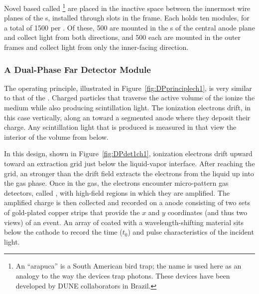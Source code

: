 Novel  based  called \footnote{An ``arapuca'' is a South American bird trap; the name is used here as an analogy to the way the devices trap photons. These devices have been developed by DUNE collaborators in Brazil.}
 are placed in the inactive space between the innermost wire planes of the s, installed through slots in the  frame. 
Each  holds ten  modules, for a total of \num{1500} per .  Of these, \num{500} are mounted in the s of the central anode plane and collect light from both directions, 
and \num{500} each are mounted in the outer  frames and collect light from only the inner-facing direction. 

\FloatBarrier
\subsubsection{A Dual-Phase Far Detector Module}
\label{sec:fddp-exec-splar}

The  operating principle, illustrated in Figure~\ref{fig:DPprinciplech1}, is very similar to that of the . %
 Charged particles that traverse the active volume of the  ionize the medium while also producing scintillation light.  The ionization electrons drift, in this case vertically, along an \efield toward a segmented anode where they deposit their charge. Any scintillation light that is produced is measured in   that view the interior of the volume from below. 
 
 In this design, shown in Figure~\ref{fig:DPdet1ch1}, ionization electrons drift upward toward an extraction grid just below the liquid-vapor interface. 
After reaching the grid, an \efield stronger than the \dpnominaldriftfield{} drift field extracts the electrons from the liquid up into the gas phase. Once in the gas, the electrons encounter micro-pattern gas detectors, called , with high-field regions
in which they are amplified. 
The amplified charge is then collected and recorded on a \twod anode
consisting of two sets of %
gold-plated copper strips that provide the $x$ and $y$ coordinates (and thus two views) of an event. 
An array of  coated with a wavelength-shifting material sits below the cathode to record the time ($t_{0}$) and pulse characteristics of the incident light.


